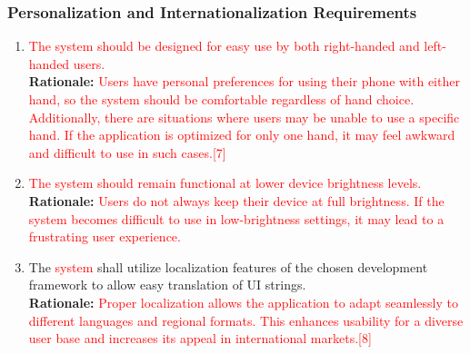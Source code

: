 \documentclass{article}
\begin{document}
\subsubsection{Personalization and Internationalization Requirements}
\label{ssub:personalization_and_internationalization_requirements}
\begin{enumerate}[{UH-PI}1. ]
	\item \textcolor{red} {The system should be designed for easy use by both right-handed and left-handed users.}\\
	\textbf{Rationale:} \textcolor{red}{Users have personal preferences for using their phone with either hand, so the system should be comfortable regardless of hand choice. Additionally, there are situations where users may be unable to use a specific hand. If the application is optimized for only one hand, it may feel awkward and difficult to use in such cases.[7]}\\
	\item \textcolor{red} {The system should remain functional at lower device brightness levels.}\\
	\textbf{Rationale:} \textcolor{red} {Users do not always keep their device at full brightness. If the system becomes difficult to use in low-brightness settings, it may lead to a frustrating user experience.}\\
	\item The \textcolor{red} {system} shall utilize localization features of the chosen development framework to allow easy translation of UI strings.\\
	\textbf{Rationale:} \textcolor{red} {Proper localization allows the application to adapt seamlessly to different languages and regional formats. This enhances usability for a diverse user base and increases its appeal in international markets.[8]}\\

\end{enumerate}
\end{document}
